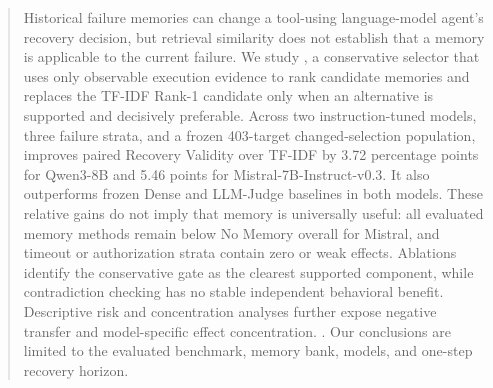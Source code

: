 \begin{abstract}
Historical failure memories can change a tool-using language-model agent's recovery decision, but retrieval similarity does not establish that a memory is applicable to the current failure. We study \proper, a conservative selector that uses only observable execution evidence to rank candidate memories and replaces the TF-IDF Rank-1 candidate only when an alternative is supported and decisively preferable. Across two instruction-tuned models, three failure strata, and a frozen 403-target changed-selection population, \proper{} improves paired Recovery Validity over TF-IDF by 3.72 percentage points for Qwen3-8B and 5.46 points for Mistral-7B-Instruct-v0.3. It also outperforms frozen Dense and LLM-Judge baselines in both models. These relative gains do not imply that memory is universally useful: all evaluated memory methods remain below No Memory overall for Mistral, and timeout or authorization strata contain zero or weak effects. Ablations identify the conservative gate as the clearest supported component, while contradiction checking has no stable independent behavioral benefit. Descriptive risk and concentration analyses further expose negative transfer and model-specific effect concentration. \todoVOne. Our conclusions are limited to the evaluated benchmark, memory bank, models, and one-step recovery horizon.
\end{abstract}
